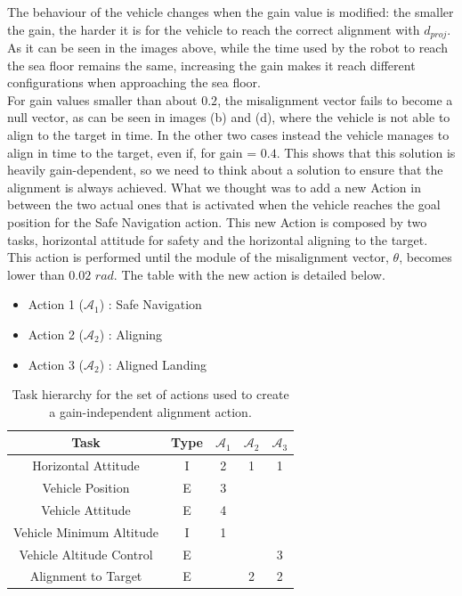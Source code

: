 \documentclass{article}
\begin{document}
The behaviour of the vehicle changes when the gain value is modified: the smaller the gain, the harder it is for the vehicle to reach the correct alignment with \(d_{proj}\). As it can be seen in the images above, while the time used by the robot to reach the sea floor remains the same, increasing the gain makes it reach different configurations when approaching the sea floor.\\
For gain values smaller than about \(0.2\), the misalignment vector fails to become a null vector, as can be seen in images (b) and (d), where the vehicle is not able to align to the target in time. In the other two cases instead the vehicle manages to align in time to the target, even if, for gain = \(0.4\).
This shows that this solution is heavily gain-dependent, so we need to think about a solution to ensure that the alignment is always achieved.
What we thought was to add a new Action in between the two actual ones that is activated when the vehicle reaches the goal position for the Safe Navigation action. This new Action is composed by two tasks, horizontal attitude for safety and the horizontal aligning to the target. This action is performed until the module of the misalignment vector, $\theta$, becomes lower than \(0.02 \) \({rad}\). The table with the new action is detailed below. \\


\begin{table}[htb]
	\caption{Task hierarchy for the set of actions used to create a gain-independent alignment action.}
	\begin{itemize}
		\item Action 1 ($\mathcal{A}_{1}$) : Safe Navigation
		\item Action 2 ($\mathcal{A}_{2}$) : Aligning
		\item Action 3 ($\mathcal{A}_{2}$) : Aligned Landing
	\end{itemize}
	\label{tb_align3:actions_table}
	\begin{center}
		\footnotesize
		\begin{tabular}{ccccc}
			\toprule
			Task & Type & $\mathcal{A}_{1}$ & $\mathcal{A}_{2}$ & $\mathcal{A}_{3}$\\
			\midrule
			Horizontal Attitude             & I & 2 & 1 & 1 \\
			\hdashline
			Vehicle Position				& E & 3 &   &   \\
			\hdashline
			Vehicle Attitude                & E & 4 &   &   \\
			\hdashline
			Vehicle Minimum Altitude        & I & 1 &   &   \\
			\hdashline
			Vehicle Altitude Control        & E &   &   & 3 \\
			\hdashline
			Alignment to Target             & E &   & 2 & 2 \\
			
			\bottomrule
		\end{tabular}
	\end{center}
\end{table}%
\end{document}
